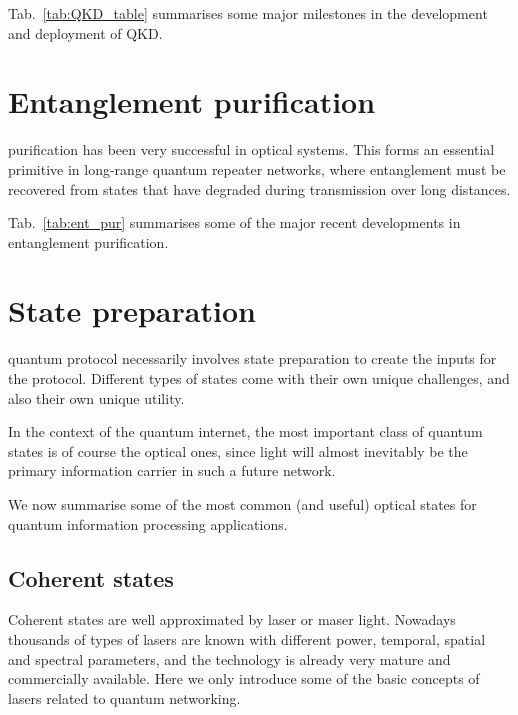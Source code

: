 Tab.~\ref{tab:QKD_table} summarises some major milestones in the development and deployment of QKD.

%
%

\section{Entanglement purification} 

 purification has been very successful in optical systems. This forms an essential primitive in long-range quantum repeater networks, where entanglement must be recovered from states that have degraded during transmission over long distances.

 Tab.~\ref{tab:ent_pur} summarises some of the  major recent developments in entanglement purification.

%
%

\section{State preparation} 

 quantum protocol necessarily involves state preparation to create the inputs for the protocol. Different types of states come with their own unique challenges, and also their own unique utility.

In the context of the quantum internet, the most important class of quantum states is of course the optical ones, since light will almost inevitably be the primary information carrier in such a future network.

We now summarise some of the most common (and useful) optical states for quantum information processing applications.

%
%

\subsection{Coherent states} 

Coherent states are well approximated by laser or maser light. Nowadays thousands of types of lasers are known with different power, temporal, spatial and spectral parameters, and the technology is already very mature and commercially available. Here we only introduce some of the basic concepts of lasers related to quantum networking.

